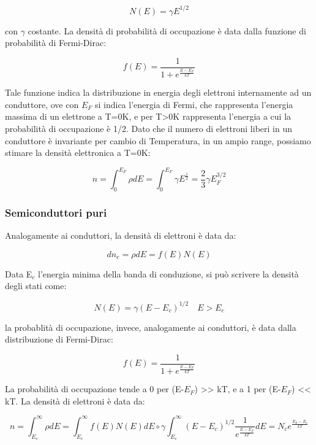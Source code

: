 \documentclass{article}
\begin{document}
\begin{equation}
    N(E) = \gamma E^{1/2}
\end{equation}

con $\gamma$ costante.
La densità di probabilità di occupazione è data dalla funzione di probabilità di Fermi-Dirac:

\begin{equation}
    f(E) = \frac{1}{1+e^{\frac{E-E_F}{kT}}}
\end{equation}

Tale funzione indica la distribuzione in energia degli elettroni internamente ad un conduttore, ove con $E_F$ si indica l'energia di Fermi, che rappresenta l'energia massima di un elettrone a T=0K, e per T>0K rappresenta l'energia a cui la probabilità di occupazione è 1/2.
Dato che il numero di elettroni liberi in un conduttore è invariante per cambio di Temperatura, in un ampio range,
possiamo stimare la densità elettronica a T=0K:

\begin{equation}
    n = \int_{0}^{E_F} \rho dE =\int_{0}^{E_F} \gamma E^{\frac{1}{2}}=\frac{2}{3}\gamma E_F^{3/2}
\end{equation}

\subsubsection{Semiconduttori puri}
Analogamente ai conduttori, la densità di elettroni è data da:

\begin{equation}
    d n_e= \rho dE= f(E) N(E)
\end{equation}

Data E$_c$ l'energia minima della banda di conduzione, si può scrivere la densità degli stati come:

\begin{equation}
    N(E) = \gamma (E-E_c)^{1/2} \quad E > E_c
\end{equation}

la probablità di occupazione, invece, analogamente ai conduttori, è data dalla distribuzione di Fermi-Dirac:

\begin{equation}
    f(E) = \frac{1}{1+e^{\frac{E-E_F}{kT}}}
\end{equation}

La probabilità di occupazione tende a 0 per (E-$E_F$) >> kT, e a 1 per (E-$E_F$) << kT.
La densità di elettroni è data da:

\begin{equation}
    n = \int_{E_c}^{\infty} \rho dE = \int_{E_c}^{\infty} f(E) N(E) dE \circ \gamma \int_{E_c}^{\infty} (E-E_c)^{1/2} \frac{1}{e^{\frac{E-E_F}{kT}}} dE= N_c e^{\frac{E_F-E_c}{kT}}
\end{equation}
\end{document}
